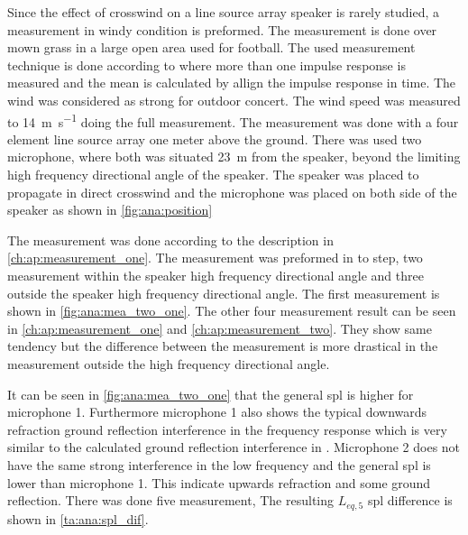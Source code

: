 Since the effect of crosswind on a line source array speaker is rarely studied, a measurement in windy condition is preformed. The measurement is done over mown grass in a large open area used for football. The used measurement technique is done according to \citep{gunness2001loudspeaker} where more than one impulse response is measured and the mean is calculated by allign the impulse response in time. The wind was considered as strong for outdoor concert. The wind speed was measured to  \SI{14}{\meter\per\second} doing the full measurement. The measurement was done with a four element line source array one meter above the ground. There was used two microphone, where both was situated \SI{23}{\meter} from the speaker, beyond the limiting high frequency directional angle of the speaker. The speaker was placed to propagate in direct crosswind and the microphone was placed on both side of the speaker as shown in \autoref{fig:ana:position}



The measurement was done according to the description in \autoref{ch:ap:measurement_one}. The measurement was preformed in to step, two measurement within the speaker high frequency directional angle and three outside the speaker high frequency directional angle. The first measurement is shown in \autoref{fig:ana:mea_two_one}. The other four measurement result can be seen in \autoref{ch:ap:measurement_one} and \autoref{ch:ap:measurement_two}. They show same tendency but the difference between the measurement is more drastical in the measurement outside the high frequency directional angle. 



It can be seen in \autoref{fig:ana:mea_two_one} that the general \gls{spl} is higher for microphone 1. Furthermore microphone 1 also shows the typical downwards refraction ground reflection interference in the frequency response which is very similar to the calculated ground reflection interference in \citep{review_of_sound}.  Microphone 2 does not have the same strong interference in the low frequency and the general \gls{spl} is lower than microphone 1. This indicate upwards refraction and some ground reflection. There was done five measurement, The resulting $L_{eq,5}$ \gls{spl} difference is shown in \autoref{ta:ana:spl_dif}.

